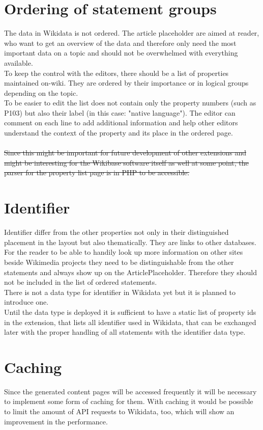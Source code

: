 \section{Ordering of statement groups}
The data in Wikidata is not ordered. The article placeholder are aimed at reader, who want to get an overview of the data and therefore only need the most important data on a topic and should not be overwhelmed with everything available. 
\\
To keep the control with the editors, there should be a list of properties maintained on-wiki. They are ordered by their importance or in logical groups depending on the topic. \\
To be easier to edit the list does not contain only the property numbers (such as P103) but also their label (in this case: "native language"). The editor can comment on each line to add additional information and help other editors understand the context of the property and its place in the ordered page. \\
\\
\st{Since this might be important for future development of other extensions and might be interesting for the Wikibase software itself as well at some point, the parser for the property list page is in PHP to be accessible.}  \\

\section {Identifier}
Identifier differ from the other properties not only in their distinguished placement in the layout but also thematically. They are links to other databases. For the reader to be able to handily look up more information on other sites beside Wikimedia projects they need to be distinguishable from the other statements and always show up on the ArticlePlaceholder. Therefore they should not be included in the list of ordered statements. \\
There is not a data type for identifier in Wikidata yet but it is planned to introduce one. \\
Until the data type is deployed it is sufficient to have a static list of property ids in the extension, that lists all identifier used in Wikidata, that can be exchanged later with the proper handling of all statements with the identifier data type. 

\section{Caching}
Since the generated content pages will be accessed frequently  it will be necessary to implement some form of caching for them. With caching it would be possible to limit the amount of API requests to Wikidata, too, which will show an improvement in the performance. 


